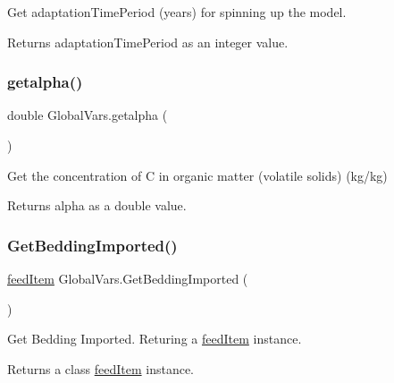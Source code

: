 Get adaptation\+Time\+Period (years) for spinning up the model. 

\begin{DoxyReturn}{Returns}
adaptation\+Time\+Period as an integer value. 
\end{DoxyReturn}
\mbox{\label{class_global_vars_a1e20c582fffb03946d2bb113d36cb80c}} 
\subsubsection{\texorpdfstring{getalpha()}{getalpha()}}
{\footnotesize\ttfamily double Global\+Vars.\+getalpha (\begin{DoxyParamCaption}{ }\end{DoxyParamCaption})\hspace{0.3cm}{\ttfamily [inline]}}



Get the concentration of C in organic matter (volatile solids) (kg/kg) 

\begin{DoxyReturn}{Returns}
alpha as a double value. 
\end{DoxyReturn}
\mbox{\label{class_global_vars_a092e7eeb7bece400396938d44551a9f5}} 
\subsubsection{\texorpdfstring{GetBeddingImported()}{GetBeddingImported()}}
{\footnotesize\ttfamily \mbox{\hyperlink{classfeed_item}{feed\+Item}} Global\+Vars.\+Get\+Bedding\+Imported (\begin{DoxyParamCaption}{ }\end{DoxyParamCaption})\hspace{0.3cm}{\ttfamily [inline]}}



Get Bedding Imported. Returing a \mbox{\hyperlink{classfeed_item}{feed\+Item}} instance. 

\begin{DoxyReturn}{Returns}
a class \mbox{\hyperlink{classfeed_item}{feed\+Item}} instance. 
\end{DoxyReturn}
\mbox{\label{class_global_vars_a3395cb56ec72d5e9257d67860d7c29c8}} 
